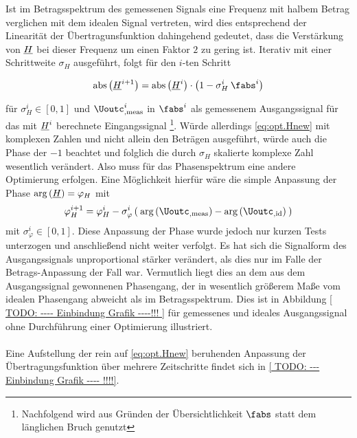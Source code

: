 \documentclass[../Report.tex]{subfiles}
\begin{document}
Ist im Betragsspektrum des gemessenen Signals eine Frequenz mit halbem Betrag verglichen mit dem idealen Signal vertreten, wird dies entsprechend der Linearität der Übertragunsfunktion dahingehend gedeutet, dass die Verstärkung von $\underline{H}$ bei dieser Frequenz um einen Faktor $2$ zu gering ist.
Iterativ mit einer Schrittweite $\sigma_H$ ausgeführt, folgt für den $i$-ten Schritt

\begin{align}
\label{eq:opt.Hnew}
	\mathrm{abs} \left( \Hcompl^{i+1} \right)
		=\mathrm{abs} \left( \Hcompl^{i}  \right) \cdot
		\left( 1 - \sigma_H^i \: \fabs^{i}	\right)					 
\end{align}

für $\sigma_H^i \in \left[ 0 , 1 \right]$ und $\Uoutc_{, \mathrm{meas}}^{i}$ in $\fabs^{i}$ als gemessenem Ausgangssignal für das mit $\underline{H}^{i}$ berechnete Eingangssignal \footnote{Nachfolgend wird aus Gründen der Übersichtlichkeit $\fabs$ statt dem länglichen Bruch genutzt}. 
Würde allerdings \eqref{eq:opt.Hnew} mit komplexen Zahlen und nicht allein den Beträgen ausgeführt, würde auch die Phase der $-1$ beachtet und folglich die durch $\sigma_H$ skalierte komplexe Zahl wesentlich verändert. Also muss für das Phasenspektrum eine andere Optimierung erfolgen.
Eine Möglichkeit hierfür wäre die simple Anpassung der Phase $ \mathrm{arg} \left( \underline{H} \right) = \varphi_H$ mit 
\begin{align}
\label{eq:opt.HnewPhase}
	\varphi_H^{i+1} = \varphi_H^{i} - \sigma_{\varphi}^{i} 
			\left( \: \mathrm{arg} \left( \Uoutc_{, \mathrm{meas}} \right)
					- \mathrm{arg} \left( \Uoutc_{, \mathrm{id}} \right) \: \right)
\end{align}
mit $\sigma_{\varphi}^i \in \left[ 0 , 1 \right]$. Diese Anpassung der Phase wurde jedoch nur kurzen Tests unterzogen und anschließend nicht weiter verfolgt. Es hat sich die Signalform des Ausgangssignals unproportional stärker verändert, als dies nur im Falle der Betrags-Anpassung der Fall war. Vermutlich %
liegt dies an dem aus dem Ausgangssignal gewonnenen Phasengang, der in wesentlich größerem Maße vom idealen Phasengang abweicht als im Betragsspektrum. Dies ist in Abbildung \ref{ TODO: ---- Einbindung Grafik ----!!! } für gemessenes und ideales Ausgangssignal ohne Durchführung einer Optimierung illustriert. 
\\
\\
Eine Aufstellung der rein auf \eqref{eq:opt.Hnew} beruhenden Anpassung der Übertragungsfunktion über mehrere Zeitschritte findet sich in \ref{ TODO: --- Einbindung Grafik ---- !!!!}. 
\end{document}
